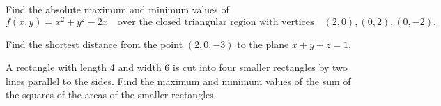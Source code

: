 \documentclass[12pt]{exam}
\begin{document}
\begin{questions}
\question Find the absolute maximum and minimum values of 
\[
    f(x,y)=x^2+y^2-2x \quad \text{over the closed triangular region with vertices} \quad (2,0),(0,2),(0,-2).
\]
    \ifprintanswers
        \begin{solution}
        \end{solution}
    \else
        \vfill
    \fi

\question Find the shortest distance from the point \((2,0,-3)\) to the plane \(x+y+z=1\).
    \ifprintanswers
        \begin{solution}
        \end{solution}
    \else
        \vfill
    \fi

\question A rectangle with length 4 and width 6 is cut into four smaller rectangles by two lines parallel to the sides. Find the maximum and minimum values of the sum of the squares of the areas of the smaller rectangles.
    \ifprintanswers
        \begin{solution}
        \end{solution}
    \else
        \vfill
    \fi 

\end{questions}
\end{document}
